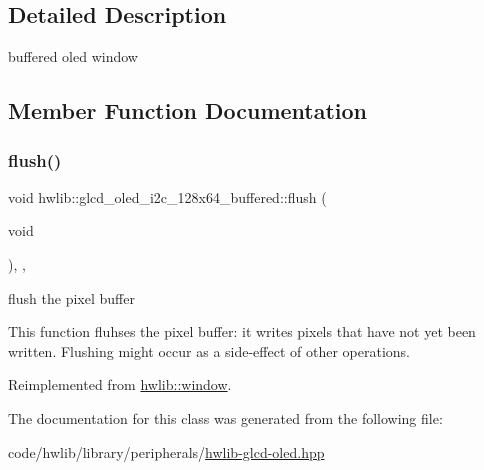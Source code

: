 \subsection{Detailed Description}
buffered oled window 

\subsection{Member Function Documentation}
\mbox{\label{classhwlib_1_1glcd__oled__i2c__128x64__buffered_aa2f62fb4a54ea1cfa9f608e703fd046e}} 
\subsubsection{\texorpdfstring{flush()}{flush()}}
{\footnotesize\ttfamily void hwlib\+::glcd\+\_\+oled\+\_\+i2c\+\_\+128x64\+\_\+buffered\+::flush (\begin{DoxyParamCaption}\item[{void}]{ }\end{DoxyParamCaption})\hspace{0.3cm}{\ttfamily [inline]}, {\ttfamily [override]}, {\ttfamily [virtual]}}



flush the pixel buffer 

This function fluhses the pixel buffer\+: it writes pixels that have not yet been written. Flushing might occur as a side-\/effect of other operations. 

Reimplemented from \hyperlink{classhwlib_1_1window_a2b654a98872d174173e1df24a444c949}{hwlib\+::window}.



The documentation for this class was generated from the following file\+:\begin{DoxyCompactItemize}
\item 
code/hwlib/library/peripherals/\hyperlink{library_2peripherals_2hwlib-glcd-oled_8hpp}{hwlib-\/glcd-\/oled.\+hpp}\end{DoxyCompactItemize}
